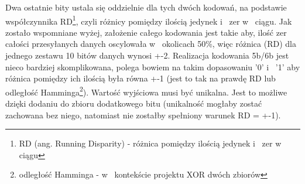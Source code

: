 \documentclass{BscUS}
\begin{document}
Dwa ostatnie bity ustala się oddzielnie dla tych dwóch kodowań, na podstawie współczynnika RD\footnote{RD (ang. Running Disparity) - różnica pomiędzy ilością jedynek i~ zer w~ ciągu}, czyli różnicy pomiędzy ilością jedynek i~ zer w~ ciągu. Jak zostało wspomniane wyżej, założenie całego kodowania jest takie aby, ilość zer całości przesyłanych danych oscylowała w~ okolicach 50\%, więc różnica (RD) dla jednego zestawu 10 bitów danych wynosi +-2.
\newline
\indent Realizacja kodowania 5b/6b jest nieco bardziej skomplikowana, polega bowiem na takim dopasowaniu '0' i~ '1' aby różnica pomiędzy ich ilością była równa +-1 (jest to tak na prawdę RD lub odległość Hamminga\footnote{odległość Hamminga - w~ kontekście projektu XOR dwóch zbiorów}). Wartość wyjściowa musi być unikalna. Jest to możliwe dzięki dodaniu do zbioru dodatkowego bitu (unikalność mogłaby zostać zachowana bez niego, natomiast nie zostałby spełniony warunek RD = +-1).
\newline
\iffalse 
\end{document}
